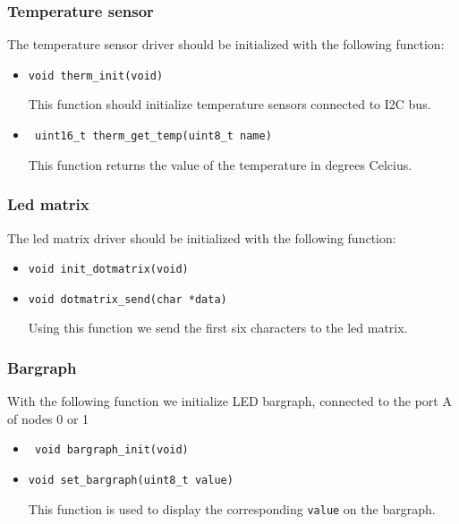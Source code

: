\documentclass{scrreprt}
\begin{document}
\subsubsection{Temperature sensor}
The temperature sensor driver should be initialized with the following function:

\begin{itemize}

\item\texttt{void therm_init(void)}

This function should initialize temperature sensors connected to I2C bus.

\item\texttt{ uint16_t therm_get_temp(uint8_t name)}

This function returns the value of the temperature in degrees Celcius.

\end{itemize}


\subsubsection{Led matrix}
The led matrix driver should be initialized with the following function:

\begin{itemize}

\item\texttt{void init_dotmatrix(void)}


\item\texttt{void dotmatrix_send(char *data)}

Using this function we send the first six characters to the led matrix.

\end{itemize}

\subsubsection{Bargraph}
With the following function we initialize LED bargraph, connected to the port A of nodes 0 or 1 
\begin{itemize}

\item\texttt{ void bargraph_init(void)}

\item\texttt{void set_bargraph(uint8_t value)}

This function is used to display the corresponding \texttt{value} on the bargraph.

\end{itemize}
\end{document}
